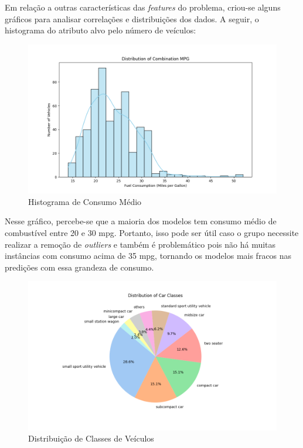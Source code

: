 \documentclass{report}
\begin{document}
Em relação a outras características das \textit{features} do problema, criou-se alguns gráficos para analisar correlações e distribuições dos dados. A seguir, o histograma
do atributo alvo pelo número de veículos:

\begin{figure}[h!]
  \centering
  \includegraphics[width=\linewidth]{images/plots/combination_dist.png}
  \caption{\label{img:combination_dist} Histograma de Consumo Médio}
\end{figure}

Nesse gráfico, percebe-se que a maioria dos modelos tem consumo médio de combustível entre 20 e 30 mpg. Portanto, isso pode ser útil caso o grupo necessite realizar a remoção de \textit{outliers}
e também é problemático pois não há muitas instâncias com consumo acima de 35 mpg, tornando os modelos mais fracos nas predições com essa grandeza de consumo.

\clearpage
\begin{figure}[h!]
  \centering
  \includegraphics[width=\linewidth]{images/plots/classes_dist.png}
  \caption{\label{img:classes_dist} Distribuição de Classes de Veículos}
\end{figure}
\end{document}
